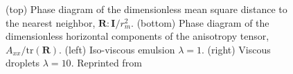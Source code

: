 \begin{figure}[h!]
    \caption{
        (top) Phase diagram of the dimensionless mean square distance to the nearest neighbor, $\textbf{R}:\textbf{I}/r_m^2$.
        (bottom) Phase diagram of the dimensionless horizontal components of the anisotropy tensor, $A_{xx}/\text{tr}(\textbf{R})$.  
        (left) Iso-viscous emulsion $\lambda = 1$.
        (right) Viscous droplets $\lambda = 10$.
        Reprinted from \citet{fintzi2024buoyancy} }
    \label{fig:A2}
\end{figure}


